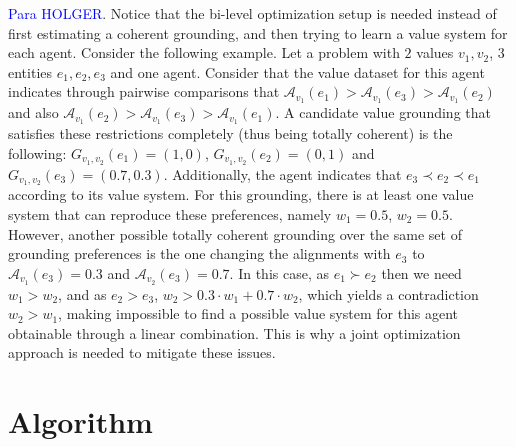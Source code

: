 \documentclass{ecai}
\newcommand{\A}{\mathcal{A}}
\begin{document}
\textcolor{blue}{Para HOLGER}. Notice that the bi-level optimization setup is needed instead of first estimating a coherent grounding, and then trying to learn a value system for each agent. Consider the following example. Let a problem with $2$ values $v_1,v_2$, 3 entities $e_1,e_2,e_3$ and one agent. Consider that the value dataset for this agent indicates through pairwise comparisons that $\A_{v_1}(e_1) > \A_{v_1}(e_3) > \A_{v_1}(e_2)$ and also $\A_{v_1}(e_2) > \A_{v_1}(e_3) > \A_{v_1}(e_1)$. A candidate value grounding that satisfies these restrictions completely (thus being totally coherent) is the following: $G_{v_1,v_2}(e_1)=(1,0)$, $G_{v_1,v_2}(e_2)=(0,1)$ and $G_{v_1,v_2}(e_3)=(0.7,0.3)$. Additionally, the agent indicates that $e_3 \prec e_2 \prec e_1$ according to its value system.   For this grounding, there is at least one value system that can reproduce these preferences, namely $w_1 = 0.5$, $w_2=0.5$. However, another possible totally coherent grounding over the same set of grounding preferences is the one changing the alignments with $e_3$ to $\A_{v_1}(e_3) = 0.3$ and $\A_{v_2}(e_3) = 0.7$. In this case, as $e_1 \succ e_2$ then we need $w_1 > w_2$, and as $e_2 > e_3$, $w_2 > 0.3\cdot w_1 + 0.7 \cdot w_2 $, which yields a contradiction $w_2 > w_1$, making impossible to find a possible value system for this agent obtainable through a linear combination. This is why a joint optimization approach is needed to mitigate these issues. 

\section{Algorithm}



\end{document}
